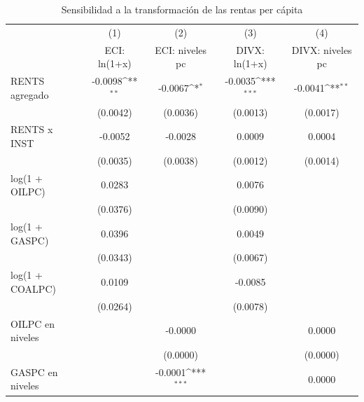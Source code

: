 \begin{table}[htbp]\centering
\def\sym#1{\ifmmode^{#1}\else\(^{#1}\)\fi}
\caption{Sensibilidad a la transformación de las rentas per cápita}
\begin{tabular}{l*{4}{c}}
\toprule
                    &\multicolumn{1}{c}{(1)}&\multicolumn{1}{c}{(2)}&\multicolumn{1}{c}{(3)}&\multicolumn{1}{c}{(4)}\\
                    &\multicolumn{1}{c}{ECI: ln(1+x)}&\multicolumn{1}{c}{ECI: niveles pc}&\multicolumn{1}{c}{DIVX: ln(1+x)}&\multicolumn{1}{c}{DIVX: niveles pc}\\
\midrule
RENTS agregado      &     -0.0098\sym{**} &     -0.0067\sym{*}  &     -0.0035\sym{***}&     -0.0041\sym{**} \\
                    &    (0.0042)         &    (0.0036)         &    (0.0013)         &    (0.0017)         \\
\addlinespace
RENTS x INST        &     -0.0052         &     -0.0028         &      0.0009         &      0.0004         \\
                    &    (0.0035)         &    (0.0038)         &    (0.0012)         &    (0.0014)         \\
\addlinespace
log(1 + OILPC)      &      0.0283         &                     &      0.0076         &                     \\
                    &    (0.0376)         &                     &    (0.0090)         &                     \\
\addlinespace
log(1 + GASPC)      &      0.0396         &                     &      0.0049         &                     \\
                    &    (0.0343)         &                     &    (0.0067)         &                     \\
\addlinespace
log(1 + COALPC)     &      0.0109         &                     &     -0.0085         &                     \\
                    &    (0.0264)         &                     &    (0.0078)         &                     \\
\addlinespace
OILPC en niveles    &                     &     -0.0000         &                     &      0.0000         \\
                    &                     &    (0.0000)         &                     &    (0.0000)         \\
\addlinespace
GASPC en niveles    &                     &     -0.0001\sym{***}&                     &      0.0000         \\

\end{tabular}
\end{table}
